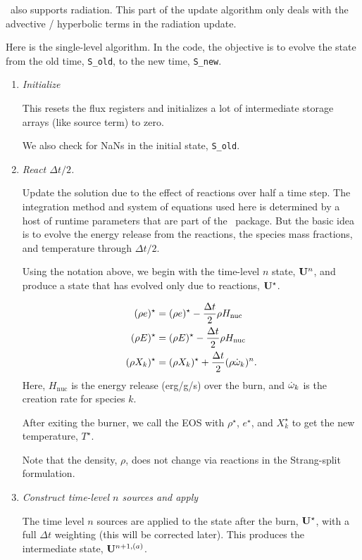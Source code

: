 \castro\ also supports radiation.  This part of the update algorithm
only deals with the advective / hyperbolic terms in the radiation update.

Here is the single-level algorithm.  In the code, the objective is to
evolve the state from the old time, {\tt S\_old}, to the new time,
{\tt S\_new}.  

\begin{enumerate}
\item {\em Initialize}

This resets the flux registers and initializes a lot of intermediate
storage arrays (like source term) to zero.

We also check for NaNs in the initial state, {\tt S\_old}.

\item {\em React $\Delta t/2$.}

Update the solution due to the effect of reactions over half a time
step.  The integration method and system of equations used here is
determined by a host of runtime parameters that are part of the
\microphysics\ package.  But the basic idea is to evolve the energy
release from the reactions, the species mass fractions, and
temperature through $\Delta t/2$.  

Using the notation above, we begin with the time-level $n$ state,
${\bf U}^n$, and produce a state that has evolved only due to reactions,
${\bf U}^\star$.

\begin{align}
(\rho e)^\star &= (\rho e)^\star - \frac{\Delta t}{2} \rho H_\mathrm{nuc} \\
(\rho E)^\star &= (\rho E)^\star - \frac{\Delta t}{2} \rho H_\mathrm{nuc} \\
(\rho X_k)^\star &= (\rho X_k)^\star + \frac{\Delta t}{2}(\rho\dot\omega_k)^n.
\end{align}
Here, $H_\mathrm{nuc}$ is the energy release (erg/g/s) over the burn,
and $\dot\omega_k$ is the creation rate for species $k$.

After exiting the burner, we call the EOS with $\rho^\star$,
$e^\star$, and $X_k^\star$ to get the new temperature, $T^\star$.

Note that the density, $\rho$, does not change via reactions in the
Strang-split formulation.


\item {\em Construct time-level $n$ sources and apply}

The time level $n$ sources are applied to the state after the burn, ${\bf U}^\star$, 
with a full $\Delta t$ weighting (this will be corrected later).  This produces
the intermediate state, ${\bf U}^{n+1,(a)}$.


\end{enumerate}
